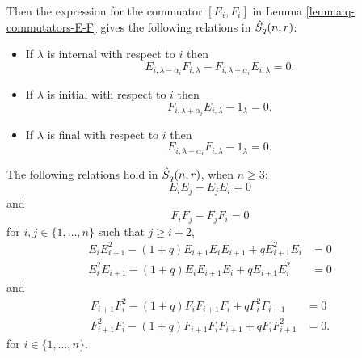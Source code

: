 \documentclass[a4paper, 11pt]{report}
\begin{document}
Then the expression for the commuator $\left[E_i,F_i\right]$ in Lemma \ref{lemma:q-commutators-E-F} gives the following relations in $\hat{S}_q(n,r)$:
\begin{itemize}
\item
If $\lambda$ is internal with respect to $i$ then
\begin{equation*}
E_{i,\lambda-\alpha_i}F_{i,\lambda} -F_{i,\lambda+\alpha_i}E_{i,\lambda} = 0.
\end{equation*}
\item
If $\lambda$ is initial with respect to $i$ then
\begin{equation*}
F_{i,\lambda+\alpha_i}E_{i,\lambda} - 1_{\lambda} = 0.
\end{equation*}
\item
If $\lambda$ is final with respect to $i$ then
\begin{equation*}
E_{i,\lambda-\alpha_i}F_{i,\lambda} - 1_{\lambda} = 0.
\end{equation*}
\end{itemize}

\begin{lemma}\label{lemma:q-serre-relations}
The following relations hold in $\hat{S}_q(n,r)$, when $n\geq 3$:
\begin{equation*}
E_i E_j - E_j E_i = 0
\end{equation*}
and
\begin{equation*}
F_i F_j - F_j F_i = 0
\end{equation*}
for $i,j\in\{1,\ldots,n\}$ such that $j\geq i+2$,
\begin{align*}
E_i E_{i+1}^2 - (1+q)E_{i+1} E_i E_{i+1} + qE_{i+1}^2 E_i &= 0\\
E_i^2 E_{i+1} - (1+q)E_i E_{i+1} E_i + qE_{i+1} E_i^2 &= 0
\end{align*}
and
\begin{align*}
F_{i+1} F_i^2 - (1+q) F_i F_{i+1} F_i + qF_i^2 F_{i+1} &=0\\
F_{i+1}^2 F_i - (1+q) F_{i+1} F_i F_{i+1} + q F_i F_{i+1}^2 &= 0.
\end{align*}
for $i\in\{1,\ldots,n\}$.
\end{lemma}
\end{document}
